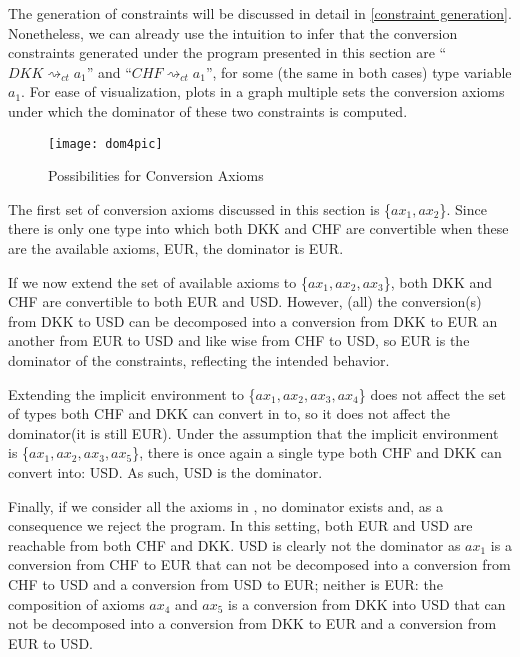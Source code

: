 The generation of constraints will be discussed in detail in \ref{constraint generation}. Nonetheless, we can already use the intuition to infer that the conversion constraints generated under the program presented in this section are ``$DKK\rightsquigarrow_{ct} a_1$'' and ``$CHF\rightsquigarrow_{ct} a_1$'', for some (the same in both cases) type variable $a_1$. For ease of visualization,  plots in a graph multiple sets the conversion axioms under which the dominator of these two constraints is computed.
\begin{figure}
  \centering
  \texttt{[image: dom4pic]}
  \caption[]{Possibilities for Conversion Axioms}
  \label{dom4pic}
\end{figure}

The first set of conversion axioms discussed in this section is \{$ax_1,ax_2$\}. Since there is only one type into which both DKK and CHF are convertible when these are the available axioms, EUR, the dominator is EUR.

If we now extend the set of available axioms to \{$ax_1,ax_2,ax_3$\}, both DKK and CHF are convertible to both EUR and USD. However, (all) the conversion(s) from DKK to USD can be decomposed into a conversion from DKK to EUR an another from EUR to USD and like wise from CHF to USD, so EUR is the dominator of the constraints, reflecting the intended behavior.

Extending the implicit environment to \{$ax_1,ax_2,ax_3,ax_4$\} does not affect the set of types both CHF and DKK can convert in to, so it does not affect the dominator(it is still EUR). Under the assumption that the implicit environment is \{$ax_1,ax_2,ax_3,ax_5$\}, there is once again a single type both CHF and DKK can convert into: USD. As such, USD is the dominator.

Finally, if we consider all the axioms in , no dominator exists and, as a consequence we reject the program. In this setting, both EUR and USD are reachable from both CHF and DKK. USD is clearly not the dominator as $ax_1$ is a conversion from CHF to EUR that can not be decomposed into a conversion from CHF to USD and a conversion from USD to EUR; neither is EUR: the composition of axioms $ax_4$ and $ax_5$ is a conversion from DKK into USD that can not be decomposed into a conversion from DKK to EUR and a conversion from EUR to USD.


